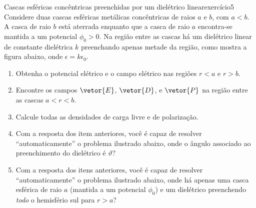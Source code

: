 \begin{exercício}{Cascas esféricas concêntricas preenchidas por um dielétrico linear}{exercício5}
    Considere duas cascas esféricas metálicas concêntricas de raios \(a\) e \(b\), com \(a < b\). A casca de raio \(b\) está aterrada enquanto que a casca de raio \(a\) encontra-se mantida a um potencial \(\phi_0 > 0\). Na região entre as cascas há um dielétrico linear de constante dielétrica \(k\) preenchando apenas metade da região, como mostra a figura abaixo, onde \(\epsilon = k \epsilon_0\).

    \begin{center}
    \end{center}

    \begin{enumerate}[label=(\alph*)]
        \item Obtenha o potencial elétrico e o campo elétrico nas regiões \(r < a\) e \(r > b\).
        \item Encontre os campos \(\vetor{E}\), \(\vetor{D}\), e \(\vetor{P}\) na região entre as cascas \(a < r < b\).
        \item Calcule todas as densidades de carga livre e de polarização.
        \item Com a resposta dos item anteriores, você é capaz de resolver \enquote{automaticamente} o problema ilustrado abaixo, onde o ângulo associado ao preenchimento do dielétrico é \(\vartheta\)?
        \item Com a resposta dos itens anteriores, você é capaz de resolver \enquote{automaticamente} o problema ilustrado abaixo, onde há apenas uma casca esférica de raio \(a\) (mantida a um potencial \(\phi_0\)) e um dielétrico preenchendo \emph{todo} o hemisfério sul para \(r > a\)?
    \end{enumerate}
        \begin{center}
\end{center}
\end{exercício}
